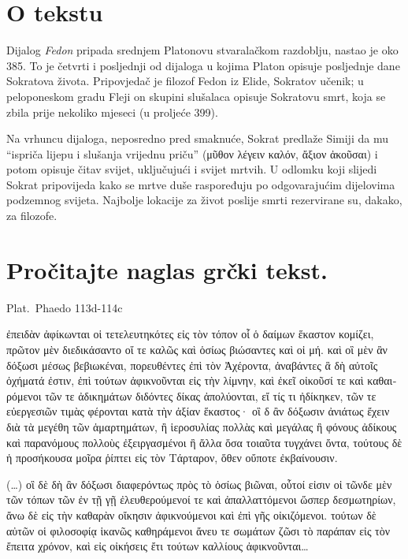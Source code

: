 


\section*{O tekstu}

Dijalog \textit{Fedon} pripada srednjem Platonovu stvaralačkom razdoblju, nastao je oko 385. To je četvrti i posljednji od dijaloga u kojima Platon opisuje posljednje dane Sokratova života. Pripovjedač je filozof Fedon iz Elide, Sokratov učenik; u peloponeskom gradu Fleji on skupini slušalaca opisuje Sokratovu smrt, koja se zbila prije nekoliko mjeseci (u proljeće 399).

Na vrhuncu dijaloga, neposredno pred smaknuće, Sokrat predlaže Simiji da mu ``ispriča lijepu i slušanja vrijednu priču'' \textgreek[variant=ancient]{(μῦθον λέγειν καλόν, ἄξιον ἀκοῦσαι)} i potom opisuje čitav svijet, uključujući i svijet mrtvih. U odlomku koji slijedi Sokrat pripovijeda kako se mrtve duše raspoređuju po odgovarajućim dijelovima podzemnog svijeta. Najbolje lokacije za život poslije smrti rezervirane su, dakako, za filozofe.



\section*{Pročitajte naglas grčki tekst.}

Plat.\ Phaedo 113d-114c


\medskip


{\large

\begin{greek}

\noindent ἐπειδὰν ἀφίκωνται οἱ τετελευτηκότες εἰς τὸν τόπον οἷ ὁ δαίμων ἕκαστον κομίζει, πρῶτον μὲν διεδικάσαντο οἵ τε καλῶς καὶ ὁσίως βιώσαντες καὶ οἱ μή. καὶ οἳ μὲν ἂν δόξωσι μέσως βεβιωκέναι, πορευθέντες ἐπὶ τὸν Ἀχέροντα, ἀναβάντες ἃ δὴ αὐτοῖς ὀχήματά ἐστιν, ἐπὶ τούτων ἀφικνοῦνται εἰς τὴν λίμνην, καὶ ἐκεῖ οἰκοῦσί τε καὶ καθαιρόμενοι τῶν τε ἀδικημάτων διδόντες δίκας ἀπολύονται, εἴ τίς τι ἠδίκηκεν, τῶν τε εὐεργεσιῶν τιμὰς φέρονται κατὰ τὴν ἀξίαν ἕκαστος· οἳ δ ἂν δόξωσιν ἀνιάτως ἔχειν διὰ τὰ μεγέθη τῶν ἁμαρτημάτων, ἢ ἱεροσυλίας πολλὰς καὶ μεγάλας ἢ φόνους ἀδίκους καὶ παρανόμους πολλοὺς ἐξειργασμένοι ἢ ἄλλα ὅσα τοιαῦτα τυγχάνει ὄντα, τούτους δὲ ἡ προσήκουσα μοῖρα ῥίπτει εἰς τὸν Τάρταρον, ὅθεν οὔποτε ἐκβαίνουσιν.

\noindent (\dots) οἳ δὲ δὴ ἂν δόξωσι διαφερόντως πρὸς τὸ ὁσίως βιῶναι, οὗτοί εἰσιν οἱ τῶνδε μὲν τῶν τόπων τῶν ἐν τῇ γῇ ἐλευθερούμενοί τε καὶ ἀπαλλαττόμενοι ὥσπερ δεσμωτηρίων, ἄνω δὲ εἰς τὴν καθαρὰν οἴκησιν ἀφικνούμενοι καὶ ἐπὶ γῆς οἰκιζόμενοι. τούτων δὲ αὐτῶν οἱ φιλοσοφίᾳ ἱκανῶς καθηράμενοι ἄνευ τε σωμάτων ζῶσι τὸ παράπαν εἰς τὸν ἔπειτα χρόνον, καὶ εἰς οἰκήσεις ἔτι τούτων καλλίους ἀφικνοῦνται\dots

\end{greek}

}


